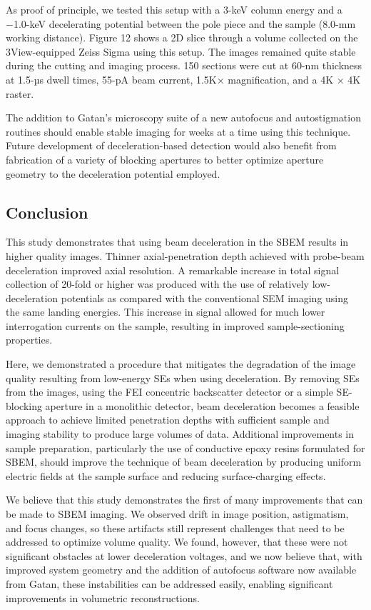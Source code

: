\documentclass{article}
\begin{document}
As proof of principle, we tested this setup with a 3-keV column energy and a −1.0-keV decelerating potential between the pole piece and the sample (8.0-mm working distance). Figure 12 shows a 2D slice through a volume collected on the 3View-equipped Zeiss Sigma using this setup. The images remained quite stable during the cutting and imaging process. 150 sections were cut at 60-nm thickness at 1.5-µs dwell times, 55-pA beam current, 1.5K× magnification, and a 4K × 4K raster.

The addition to Gatan’s microscopy suite of a new autofocus and autostigmation routines should enable stable imaging for weeks at a time using this technique. Future development of deceleration-based detection would also benefit from fabrication of a variety of blocking apertures to better optimize aperture geometry to the deceleration potential employed.

\subsection*{Conclusion}
This study demonstrates that using beam deceleration in the SBEM results in higher quality images. Thinner axial-penetration depth achieved with probe-beam deceleration improved axial resolution. A remarkable increase in total signal collection of 20-fold or higher was produced with the use of relatively low-deceleration potentials as compared with the conventional SEM imaging using the same landing energies. This increase in signal allowed for much lower interrogation currents on the sample, resulting in improved sample-sectioning properties.

Here, we demonstrated a procedure that mitigates the degradation of the image quality resulting from low-energy SEs when using deceleration. By removing SEs from the images, using the FEI concentric backscatter detector or a simple SE-blocking aperture in a monolithic detector, beam deceleration becomes a feasible approach to achieve limited penetration depths with sufficient sample and imaging stability to produce large volumes of data. Additional improvements in sample preparation, particularly the use of conductive epoxy resins formulated for SBEM, should improve the technique of beam deceleration by producing uniform electric fields at the sample surface and reducing surface-charging effects.

We believe that this study demonstrates the first of many improvements that can be made to SBEM imaging. We observed drift in image position, astigmatism, and focus changes, so these artifacts still represent challenges that need to be addressed to optimize volume quality. We found, however, that these were not significant obstacles at lower deceleration voltages, and we now believe that, with improved system geometry and the addition of autofocus software now available from Gatan, these instabilities can be addressed easily, enabling significant improvements in volumetric reconstructions.
\end{document}
